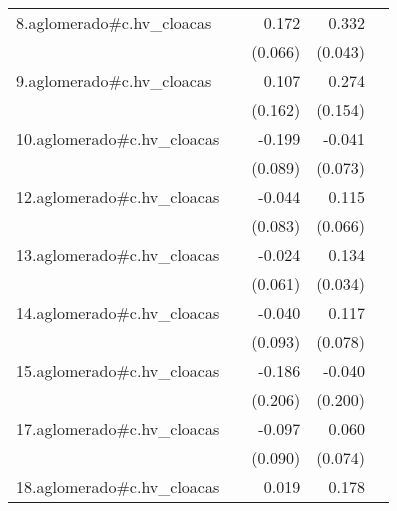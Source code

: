 {\begin{longtable}{l*{4}{D{.}{.}{-1}}}
\addlinespace
8.aglomerado#c.hv\_cloacas&                     &       0.172\sym{**} &       0.332\sym{***}&                     \\
            &                     &     (0.066)         &     (0.043)         &                     \\
\addlinespace
9.aglomerado#c.hv\_cloacas&                     &       0.107         &       0.274         &                     \\
            &                     &     (0.162)         &     (0.154)         &                     \\
\addlinespace
10.aglomerado#c.hv\_cloacas&                     &      -0.199\sym{*}  &      -0.041         &                     \\
            &                     &     (0.089)         &     (0.073)         &                     \\
\addlinespace
12.aglomerado#c.hv\_cloacas&                     &      -0.044         &       0.115         &                     \\
            &                     &     (0.083)         &     (0.066)         &                     \\
\addlinespace
13.aglomerado#c.hv\_cloacas&                     &      -0.024         &       0.134\sym{***}&                     \\
            &                     &     (0.061)         &     (0.034)         &                     \\
\addlinespace
14.aglomerado#c.hv\_cloacas&                     &      -0.040         &       0.117         &                     \\
            &                     &     (0.093)         &     (0.078)         &                     \\
\addlinespace
15.aglomerado#c.hv\_cloacas&                     &      -0.186         &      -0.040         &                     \\
            &                     &     (0.206)         &     (0.200)         &                     \\
\addlinespace
17.aglomerado#c.hv\_cloacas&                     &      -0.097         &       0.060         &                     \\
            &                     &     (0.090)         &     (0.074)         &                     \\
\addlinespace
18.aglomerado#c.hv\_cloacas&                     &       0.019         &       0.178\sym{***}&                     \\

\end{longtable}}

